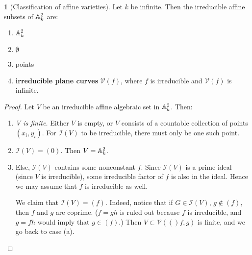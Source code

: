 \documentclass{book}
\newcommand{\I}[1]{\mathcal{I}(#1)}
\newcommand{\V}[1]{\mathcal{V}(#1)}
\newcommand{\Akn}[1]{{\Bbb A}_k^#1}
\theoremstyle{definition}
\theoremstyle{block}
\theoremstyle{thm}
\newtheorem*{thm}{}
\begin{document}
\begin{thm}[Classification of affine varieties]
  Let $k$ be infinite. Then the irreducible affine subsets of $\Akn 2$ are:
  \begin{enumerate}[label=(\alph*)]
    \item $\Akn 2$
    \item $\emptyset$
    \item points
    \item {\bfseries{irreducible plane curves}} $\V f$, where $f$ is
  irreducible and $\V f$ is infinite.
  \end{enumerate}
\end{thm}

\begin{proof}
  Let $V$ be an irreducible affine algebraic set in $\Akn 2$. Then:
  \begin{enumerate}
    \item {\textit {V is finite.}} Either $V$ is empty, or $V$ consists of a
      countable collection of points $(x_i,y_i)$. For $\I V$ to be irreducible,
      there must only be one such point.
    \item {\textit{$\I V = (0)$.}} Then $V=\Akn 2$.
    \item Else, $\I V$ contains some nonconstant $f$. Since $\I V$ is a prime
      ideal (since $V$ is irreducible), some irreducible factor of $f$ is also in the ideal.
      Hence we may assume that $f$ is irreducible as well.\par
      We claim that $\I V = (f)$. Indeed, notice that if $G\in\I V$,
      $g\notin(f)$, then $f$ and $g$ are coprime. ($f=gh$ is ruled out because
      $f$ is irreducible, and $g=fh$ would imply that $g\in(f)$.) Then
      $V\subset\V(f,g)$ is finite, and we go back to case (a).
  \end{enumerate}
\end{proof}
\end{document}
